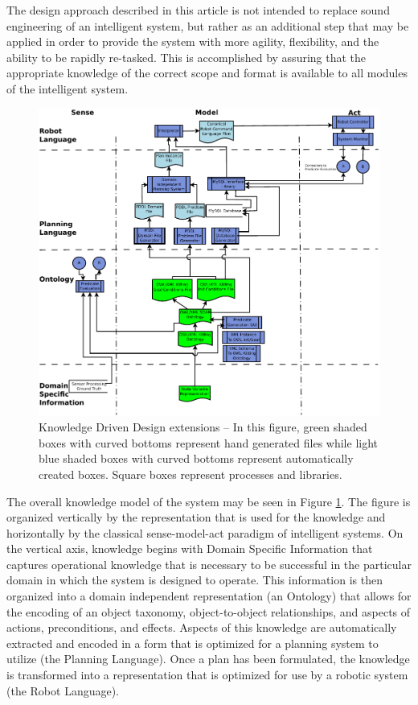 The design approach described in this article is not intended to
replace sound engineering of an intelligent system, but rather as
an additional step that may be applied in order to provide
the system with more agility, flexibility, and the ability to be rapidly
re-tasked. This is accomplished by assuring that the appropriate knowledge
of the correct scope and format is available to all modules of the
intelligent system.

\begin{figure}[ht!]
\begin{center}
\includegraphics[width=13cm]{images/KnowledgeDrivenRobotics.pdf}
\caption{Knowledge Driven Design extensions -- In this figure, green shaded boxes with curved bottoms
represent hand generated files while
light blue shaded boxes with curved bottoms represent automatically created boxes. Square
boxes represent processes and libraries.}
\label{fig:DesignArchitecture}
\end{center}
\end{figure}

The overall knowledge model of the system may be seen in Figure \ref{fig:DesignArchitecture}.
The figure is organized vertically by the representation that is used for the knowledge
and horizontally by the classical sense-model-act paradigm of intelligent systems.
On the vertical axis, knowledge begins with Domain Specific Information that captures
operational knowledge that is necessary to be successful in the particular domain in which
the system is designed to operate. This information is then organized into a domain
independent representation (an Ontology) that allows for the encoding of an object
taxonomy, object-to-object
relationships, and aspects of actions, preconditions, and effects.
Aspects of this
knowledge are automatically extracted and encoded in a form that is optimized for
a planning system to utilize (the Planning Language). Once a plan has been formulated,
the knowledge is transformed into a representation that is optimized for use by a robotic system
(the Robot Language).

